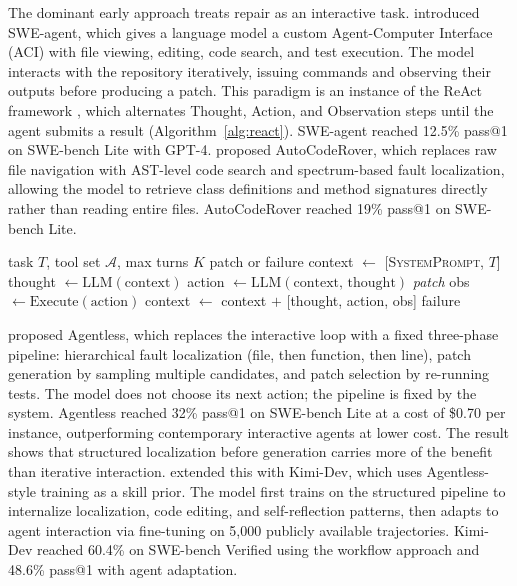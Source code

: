 The dominant early approach treats repair as an interactive task. \citet{yang2024sweagent} introduced SWE-agent, which gives a language model a custom Agent-Computer Interface (ACI) with file viewing, editing, code search, and test execution. The model interacts with the repository iteratively, issuing commands and observing their outputs before producing a patch. This paradigm is an instance of the ReAct framework \citep{yao2022react}, which alternates Thought, Action, and Observation steps until the agent submits a result (Algorithm~\ref{alg:react}). SWE-agent reached 12.5\% pass@1 on SWE-bench Lite with GPT-4. \citet{zhang2024autocoderover} proposed AutoCodeRover, which replaces raw file navigation with AST-level code search and spectrum-based fault localization, allowing the model to retrieve class definitions and method signatures directly rather than reading entire files. AutoCodeRover reached 19\% pass@1 on SWE-bench Lite.

\begin{algorithm}[ht]
\caption{ReAct agent loop, the basis of interactive SWE agents \citep{yao2022react}.}
\label{alg:react}
\begin{algorithmic}[1]
\Require task $T$, tool set $\mathcal{A}$, max turns $K$
\Ensure patch or failure
\State context $\gets$ [\textsc{SystemPrompt}, $T$]
    \State thought $\gets \text{LLM}(\text{context})$ 
    \State action $\gets \text{LLM}(\text{context, thought})$ 
        \Return \textit{patch}
    \EndIf
    \State obs $\gets \text{Execute}(\text{action})$ 
    \State context $\gets$ context $+$ [thought, action, obs]
\EndFor
\Return failure
\end{algorithmic}
\end{algorithm}

\citet{xia2024agentless} proposed Agentless, which replaces the interactive loop with a fixed three-phase pipeline: hierarchical fault localization (file, then function, then line), patch generation by sampling multiple candidates, and patch selection by re-running tests. The model does not choose its next action; the pipeline is fixed by the system. Agentless reached 32\% pass@1 on SWE-bench Lite at a cost of \$0.70 per instance, outperforming contemporary interactive agents at lower cost. The result shows that structured localization before generation carries more of the benefit than iterative interaction. \citet{yang2025kimidev} extended this with Kimi-Dev, which uses Agentless-style training as a skill prior. The model first trains on the structured pipeline to internalize localization, code editing, and self-reflection patterns, then adapts to agent interaction via fine-tuning on 5,000 publicly available trajectories. Kimi-Dev reached 60.4\% on SWE-bench Verified using the workflow approach and 48.6\% pass@1 with agent adaptation.

